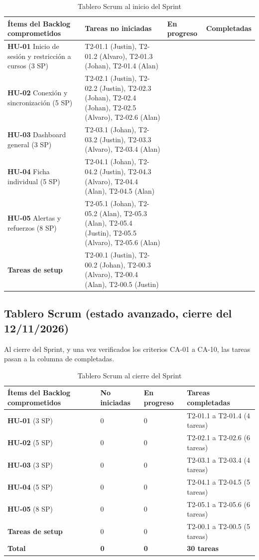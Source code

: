 \documentclass[11pt,a4paper]{article}
\newcommand{\hd}[1]{\textbf{#1}}
\begin{document}
\begin{table}[H]
\centering\small
\caption{Tablero Scrum al inicio del Sprint}
\begin{tabularx}{\textwidth}{|R{4.0cm}|Y|R{1.6cm}|R{2.0cm}|}
\hline
\hd{Ítems del Backlog comprometidos} & \hd{Tareas no iniciadas} & \hd{En progreso} & \hd{Completadas}\\ \hline
\textbf{HU-01} Inicio de sesión y restricción a cursos (3 SP) & T2-01.1 (Justin), T2-01.2 (Alvaro), T2-01.3 (Johan), T2-01.4 (Alan) & & \\ \hline
\textbf{HU-02} Conexión y sincronización (5 SP) & T2-02.1 (Justin), T2-02.2 (Justin), T2-02.3 (Johan), T2-02.4 (Johan), T2-02.5 (Alvaro), T2-02.6 (Alan) & & \\ \hline
\textbf{HU-03} Dashboard general (3 SP) & T2-03.1 (Johan), T2-03.2 (Justin), T2-03.3 (Alvaro), T2-03.4 (Alan) & & \\ \hline
\textbf{HU-04} Ficha individual (5 SP) & T2-04.1 (Johan), T2-04.2 (Justin), T2-04.3 (Alvaro), T2-04.4 (Alan), T2-04.5 (Alan) & & \\ \hline
\textbf{HU-05} Alertas y refuerzos (8 SP) & T2-05.1 (Johan), T2-05.2 (Alan), T2-05.3 (Alan), T2-05.4 (Justin), T2-05.5 (Alvaro), T2-05.6 (Alan) & & \\ \hline
\textbf{Tareas de setup} & T2-00.1 (Justin), T2-00.2 (Johan), T2-00.3 (Alvaro), T2-00.4 (Alan), T2-00.5 (Justin) & & \\ \hline
\end{tabularx}
\end{table}

\subsection{Tablero Scrum (estado avanzado, cierre del 12/11/2026)}
Al cierre del Sprint, y una vez verificados los criterios CA-01 a CA-10, las tareas pasan a la columna de completadas.

\begin{table}[H]
\centering\small
\caption{Tablero Scrum al cierre del Sprint}
\begin{tabularx}{\textwidth}{|R{4.0cm}|R{1.8cm}|R{1.8cm}|Y|}
\hline
\hd{Ítems del Backlog comprometidos} & \hd{No iniciadas} & \hd{En progreso} & \hd{Tareas completadas}\\ \hline
\textbf{HU-01} (3 SP) & 0 & 0 & T2-01.1 a T2-01.4 (4 tareas)\\ \hline
\textbf{HU-02} (5 SP) & 0 & 0 & T2-02.1 a T2-02.6 (6 tareas)\\ \hline
\textbf{HU-03} (3 SP) & 0 & 0 & T2-03.1 a T2-03.4 (4 tareas)\\ \hline
\textbf{HU-04} (5 SP) & 0 & 0 & T2-04.1 a T2-04.5 (5 tareas)\\ \hline
\textbf{HU-05} (8 SP) & 0 & 0 & T2-05.1 a T2-05.6 (6 tareas)\\ \hline
\textbf{Tareas de setup} & 0 & 0 & T2-00.1 a T2-00.5 (5 tareas)\\ \hline
\textbf{Total} & \textbf{0} & \textbf{0} & \textbf{30 tareas}\\ \hline
\end{tabularx}
\end{table}
\end{document}
